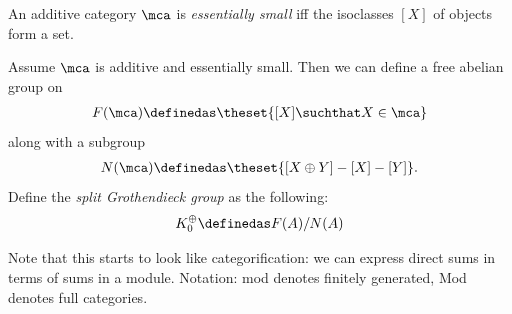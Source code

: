 \begin{definition}

An additive category \(\mca\) is \emph{essentially small} iff the
isoclasses \([X]\) of objects form a set.

\end{definition}

\begin{definition}

Assume \(\mca\) is additive and essentially small. Then we can define a
free abelian group on
\begin{align*}
F(\mca) \definedas \theset{[X] \suchthat X\in \mca}
\end{align*} along with a subgroup
\begin{align*}
N(\mca) \definedas \theset{[X\oplus Y] - [X] - [Y]}
.\end{align*} Define the \emph{split Grothendieck group} as the
following:
\begin{align*}
K_0^\oplus \definedas F(A) / N(A)
\end{align*}

\end{definition}

\begin{remark}

Note that this starts to look like categorification: we can express
direct sums in terms of sums in a module. Notation: mod denotes finitely
generated, Mod denotes full categories.

\end{remark}

